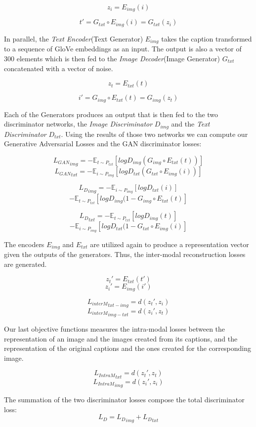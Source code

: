 \documentclass[twocolumn]{article}
\begin{document}
\[ z_i = E_{img}(i) \]

\[ t' = G_{txt}\circ E_{img}(i) = G_{txt}(z_i) \]

In parallel, the \textit{Text Encoder}(Text Generator) \boldmath$E_{img}$ takes the caption transformed to a sequence of GloVe embeddings as an input. The output is also a vector of 300 elements which is then fed to the \textit{Image Decoder}(Image Generator) \boldmath$G_{txt}$ concatenated with a vector of noise. 

\[ z_t = E_{txt}(t) \]

\[ i' = G_{img}\circ E_{txt}(t) = G_{img}(z_t) \]


Each of the Generators produces an output that is then fed to the two discriminator networks, the \textit{Image Discriminator} \boldmath$D_{img}$ and the \textit{Text Discriminator} \boldmath$D_{txt}$. Using the results of those two networks we can compute our Generative Adversarial Losses and the GAN discriminator losses:

\[ {L_{GAN}}_{img} = -\mathbb{E}_{t \sim P_{txt}}[log D_{img}(G_{img}\circ E_{txt}(t))] \]
\[ {L_{GAN}}_{txt} = -\mathbb{E}_{i \sim P_{img}}[log D_{txt}(G_{txt}\circ E_{img}(i))] \]

\[ {L_{D}}_{img} = -\mathbb{E}_{i \sim P_{img}}[log D_{txt}(i)] \] \[ -\mathbb{E}_{t \sim P_{txt}}[log D_{img}(1 - G_{img}\circ E_{txt}(t)] \]

\[ {L_{D}}_{txt} =  -\mathbb{E}_{t \sim P_{txt}}[log D_{img}(t)] \] 
\[
-\mathbb{E}_{i \sim P_{img}}[log D_{txt}(1 - G_{txt}\circ E_{img}(i)] \]



The encoders $E_{img}$ and $E_{txt}$ are utilized again to produce a representation vector given the outputs of the generators. Thus, the inter-modal reconstruction losses are generated.

\[ z_t' = E_{txt}(t') \]
\[ z_i' = E_{img}(i') \]

\[ {L_{interM}}_{txt-img} = d(z_t',z_i) \]
\[ {L_{interM}}_{img-txt} = d(z_i',z_t) \]

Our last objective functions measures the intra-modal losses between the representation of an image and the images created from its captions, and the representation of the original captions and the ones created for the corresponding image.

\[ {L_{IntraM}}_{txt} = d(z_t', z_t) \]
\[ {L_{IntraM}}_{img} = d(z_i', z_i) \]

The summation of the two discriminator losses compose the total discriminator loss: 
\[ L_D =  {L_D}_{img} + {L_D}_{txt} \]
\end{document}
